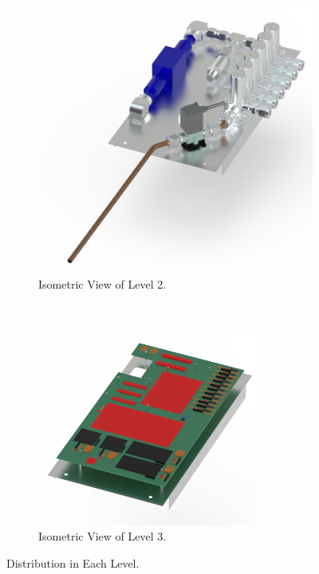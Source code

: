 \documentclass[a4paper,12pt,oneside]{article} %
\providecommand{\DIFaddbeginFL}{} %
\providecommand{\DIFaddendFL}{} %
\providecommand{\DIFdelbeginFL}{} %
\providecommand{\DIFdelendFL}{} %
\newcommand{\DIFscaledelfig}{0.5}
\newlength{\DIFdelgraphicswidth} %
\newlength{\DIFdelgraphicsheight} %
\newcommand{\DIFaddincludegraphics}[2][]{{\color{blue}\fbox{\DIFOincludegraphics[#1]{#2}}}} %
\newcommand{\DIFdelincludegraphics}[2][]{%
\sbox{\DIFdelgraphicsbox}{\DIFOincludegraphics[#1]{#2}}%
\settoboxwidth{\DIFdelgraphicswidth}{\DIFdelgraphicsbox} %
\settoboxtotalheight{\DIFdelgraphicsheight}{\DIFdelgraphicsbox} %
\scalebox{\DIFscaledelfig}{%
\parbox[b]{\DIFdelgraphicswidth}{\usebox{\DIFdelgraphicsbox}\\[-\baselineskip] \rule{\DIFdelgraphicswidth}{0em}}\llap{\resizebox{\DIFdelgraphicswidth}{\DIFdelgraphicsheight}{%
\setlength{\unitlength}{\DIFdelgraphicswidth}%
\begin{picture}(1,1)%
\thicklines\linethickness{2pt} %
{\color[rgb]{1,0,0}\put(0,0){\framebox(1,1){}}}%
{\color[rgb]{1,0,0}\put(0,0){\line( 1,1){1}}}%
{\color[rgb]{1,0,0}\put(0,1){\line(1,-1){1}}}%
\end{picture}%
}\hspace*{3pt}}} %
} %
\DeclareRobustCommand{\DIFaddbeginFL}{\DIFOaddbeginFL \let\includegraphics\DIFaddincludegraphics} %
\DeclareRobustCommand{\DIFaddendFL}{\DIFOaddendFL \let\includegraphics\DIFOincludegraphics} %
\DeclareRobustCommand{\DIFdelbeginFL}{\DIFOdelbeginFL \let\includegraphics\DIFdelincludegraphics} %
\DeclareRobustCommand{\DIFdelendFL}{\DIFOaddendFL \let\includegraphics\DIFOincludegraphics} %
\begin{document}
\begin{figure}[H]
\begin{subfigure}[b]{0.3\textwidth}
\DIFdelendFL \DIFaddbeginFL \includegraphics[width=\textwidth]{4-experiment-design/img/Mechanical/Figure_24b.png}
    \DIFaddendFL \caption{Isometric View of Level 2.}
    \label{level_2}
    \end{subfigure}
    ~
    \begin{subfigure}[b]{0.3\textwidth}
    \centering
    \DIFdelbeginFL %
\DIFdelendFL \DIFaddbeginFL \includegraphics[width=0.8\textwidth]{4-experiment-design/img/Mechanical/Figure_24c.png}
    \DIFaddendFL \caption{Isometric View of Level 3.}
    \label{level_3}
    \end{subfigure}
    \caption{Distribution in Each Level.}
    \label{fig:The-brain}
\end{figure}
\end{document}
